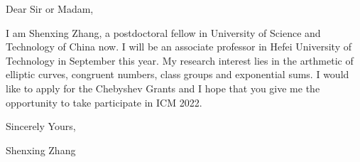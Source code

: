 \documentclass[14pt,a4paper]{article}
\begin{document}
\pagestyle{empty}


\twomedskip
{}

\large
Dear Sir or Madam,

I am Shenxing Zhang, a postdoctoral fellow in University of Science and Technology of China now.
I will be an associate professor in Hefei University of Technology in September this year.
My research interest lies in the arthmetic of elliptic curves, congruent numbers, class groups and exponential sums.
I would like to apply for the Chebyshev Grants and I hope that you give me the opportunity to take participate in ICM 2022.

Sincerely Yours,

Shenxing Zhang
\end{document}
